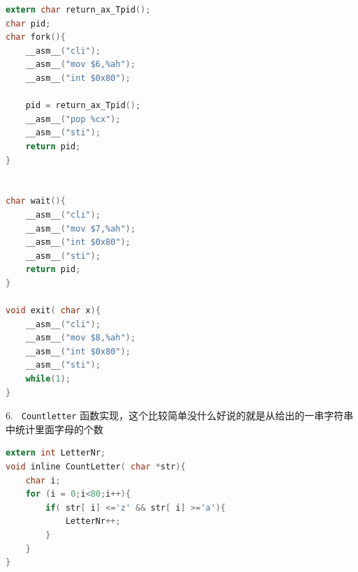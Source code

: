 \documentclass[a4paper]{article}
\begin{document}
{{{\begin{lstlisting}[language={C}]
extern char return_ax_Tpid();
char pid;
char fork(){
    __asm__("cli");
    __asm__("mov $6,%ah");
    __asm__("int $0x80");

    pid = return_ax_Tpid();
    __asm__("pop %cx");
    __asm__("sti");
    return pid;
}


char wait(){
    __asm__("cli");
    __asm__("mov $7,%ah");
    __asm__("int $0x80");
    __asm__("sti");
    return pid;
}

void exit( char x){
    __asm__("cli");
    __asm__("mov $8,%ah");
    __asm__("int $0x80");
    __asm__("sti");
    while(1);
}

	\end{lstlisting}}
  6. \verb| Countletter| 函数实现，这个比较简单没什么好说的就是从给出的一串字符串中统计里面字母的个数
  {\scriptsize \begin{lstlisting}[language={C}]
extern int LetterNr;
void inline CountLetter( char *str){
    char i;
    for (i = 0;i<80;i++){
        if( str[ i] <='z' && str[ i] >='a'){
            LetterNr++;
        }
    }
}
	\end{lstlisting}}

}
}
\end{document}
